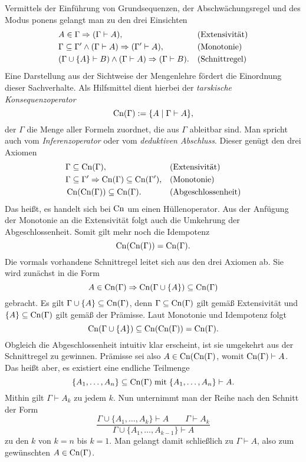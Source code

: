 Vermittels der Einführung von Grundsequenzen, der Abschwächungsregel
und des Modus ponens gelangt man zu den drei Einsichten%
\begin{align*}
&A\in\Gamma\Rightarrow (\Gamma\vdash A), &&\text{(Extensivität)}\\
&\Gamma\subseteq\Gamma'\land (\Gamma\vdash A)\Rightarrow (\Gamma'\vdash A), &&\text{(Monotonie)}\\
&(\Gamma\cup\{A\}\vdash B)\land (\Gamma\vdash A)\Rightarrow (\Gamma\vdash B). &&\text{(Schnittregel)}
\end{align*}
Eine Darstellung aus der Sichtweise der Mengenlehre fördert die Einordnung
dieser Sachverhalte. Als Hilfsmittel dient hierbei der
\emph{tarskische Konsequenzoperator}%
\[\operatorname{Cn}(\Gamma) := \{A\mid \Gamma\vdash A\},\]
der $\Gamma$ die Menge aller Formeln zuordnet,
die aus $\Gamma$ ableitbar sind. Man spricht auch vom
\emph{Inferenzoperator} oder vom \emph{deduktiven Abschluss}.
Dieser genügt den drei Axiomen
\begin{align*}
&\Gamma\subseteq\operatorname{Cn}(\Gamma), &&\text{(Extensivität)}\\
&\Gamma\subseteq\Gamma'\Rightarrow \operatorname{Cn}(\Gamma)\subseteq\operatorname{Cn}(\Gamma'), &&\text{(Monotonie)}\\
&\operatorname{Cn}(\operatorname{Cn}(\Gamma)) \subseteq \operatorname{Cn}(\Gamma). &&\text{(Abgeschlossenheit)}
\end{align*}
Das heißt, es handelt sich bei $\operatorname{Cn}$ um einen Hüllenoperator. Aus der
Anfügung der Monotonie an die Extensivität folgt auch die Umkehrung
der Abgeschlossenheit. Somit gilt mehr noch die Idempotenz
\[\operatorname{Cn}(\operatorname{Cn}(\Gamma)) = \operatorname{Cn}(\Gamma).\]
Die vormals
vorhandene Schnittregel leitet sich aus den drei Axiomen ab.
Sie wird zunächst in die Form%
\[A\in\operatorname{Cn}(\Gamma)\Rightarrow\operatorname{Cn}(\Gamma\cup\{A\})\subseteq\operatorname{Cn}(\Gamma)\]
gebracht. Es gilt $\Gamma\cup\{A\}\subseteq\operatorname{Cn}(\Gamma)$, denn
$\Gamma\subseteq\operatorname{Cn}(\Gamma)$ gilt gemäß Extensivität und
$\{A\}\subseteq\operatorname{Cn}(\Gamma)$ gilt gemäß der Prämisse.
Laut Monotonie und Idempotenz folgt%
\[\operatorname{Cn}(\Gamma\cup\{A\})\subseteq\operatorname{Cn}(\operatorname{Cn}(\Gamma)) = \operatorname{Cn}(\Gamma).\]
Obgleich die Abgeschlossenheit intuitiv klar erscheint, ist sie
umgekehrt aus der Schnittregel zu gewinnen. Prämisse sei also
$A\in\operatorname{Cn}(\operatorname{Cn}(\Gamma)$, womit $\operatorname{Cn}(\Gamma)\vdash A$. Das heißt aber,
es existiert eine endliche Teilmenge
\[\{A_1,\ldots,A_n\}\subseteq\operatorname{Cn}(\Gamma)\;\text{mit}\;
\{A_1,\ldots,A_n\}\vdash A.\]
Mithin gilt $\Gamma\vdash A_k$ zu jedem $k$.
Nun unternimmt man der Reihe nach den Schnitt der Form
\[\dfrac{\Gamma\cup\{A_1,\ldots,A_k\}\vdash A\qquad\Gamma\vdash A_k}
{\Gamma\cup\{A_1,\ldots,A_{k-1}\}\vdash A}\]
zu den $k$ von $k=n$ bis $k=1$. Man gelangt damit schließlich zu
$\Gamma\vdash A$, also zum gewünschten $A\in\operatorname{Cn}(\Gamma)$.
